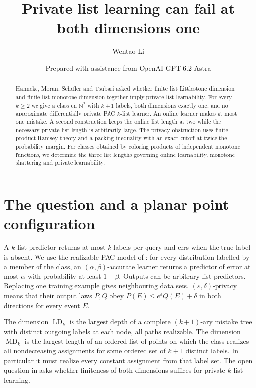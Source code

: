 \documentclass[11pt]{article}
\title{Private list learning can fail at both dimensions one}
\author{Wentao Li}
\date{\small Prepared with assistance from OpenAI GPT-6.2 Astra}
\newcommand{\LD}{\operatorname{LD}}
\newcommand{\MD}{\operatorname{MD}}
\begin{document}
\maketitle
\begin{abstract}
Hanneke, Moran, Schefler and Tsubari asked whether finite list Littlestone dimension and finite list monotone dimension together imply private list learnability. For every $k\ge2$ we give a class on $\mathbb N^2$ with $k+1$ labels, both dimensions exactly one, and no approximate differentially private PAC $k$-list learner. An online learner makes at most one mistake. A second construction keeps the online list length at two while the necessary private list length is arbitrarily large. The privacy obstruction uses finite product Ramsey theory and a packing inequality with an exact cutoff at twice the probability margin. For classes obtained by coloring products of independent monotone functions, we determine the three list lengths governing online learnability, monotone shattering and private learnability.
\end{abstract}

\section{The question and a planar point configuration}
A $k$-list predictor returns at most $k$ labels per query and errs when the true label is absent. We use the realizable PAC model of \cite{hmst}: for every distribution labelled by a member of the class, an $(\alpha,\beta)$-accurate learner returns a predictor of error at most $\alpha$ with probability at least $1-\beta$. Outputs can be arbitrary list predictors. Replacing one training example gives neighbouring data sets. $(\varepsilon,\delta)$-privacy means that their output laws $P,Q$ obey $P(E)\le e^\varepsilon Q(E)+\delta$ in both directions for every event $E$.

The dimension $\LD_k$ is the largest depth of a complete $(k+1)$-ary mistake tree with distinct outgoing labels at each node, all paths realizable. The dimension $\MD_k$ is the largest length of an ordered list of points on which the class realizes all nondecreasing assignments for some ordered set of $k+1$ distinct labels. In particular it must realize every constant assignment from that label set. The open question in \cite[\S1, p.~6]{hmst} asks whether finiteness of both dimensions suffices for private $k$-list learning.
\end{document}
